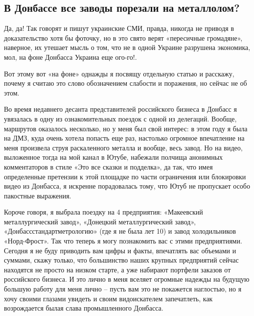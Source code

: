  
 
 
 
 
\subsection{В Донбассе все заводы порезали на металлолом?}
\label{sec:19_12_2021.yz.maj_dnr.1.donbass_zavody}


Да, да! Так говорят и пишут украинские СМИ, правда, никогда не приводя в
доказательство хотя бы фоточку, но в это свято верят «пересичные громадяне»,
наверное, их утешает мысль о том, что не в одной Украине разрушена экономика,
мол, на фоне Донбасса Украина еще ого-го!.


Вот этому вот «на фоне» однажды я посвящу отдельную статью и расскажу, почему я
считаю это слово обозначением слабости и поражения, но сейчас не об этом.

Во время недавнего десанта представителей российского бизнеса в Донбасс я
увязалась в одну из ознакомительных поездок с одной из делегаций. Вообще,
маршрутов оказалось несколько, но у меня был свой интерес: в этом году я была
на ДМЗ, куда очень хотела попасть еще раз, настолько огромное впечатление на
меня произвела струя раскаленного металла и вообще, весь завод. Но на видео,
выложенное тогда на мой канал в Ютубе, набежали полчища анонимных комментаторов
в стиле «Это все сказки и подделка», да так, что имея определенные претензии к
этой площадке по части ограничения или блокировки видео из Донбасса, я искренне
порадовалась тому, что Ютуб не пропускает особо пакостные выражения.

Короче говоря, я выбрала поездку на 4 предприятия: «Макеевский металлургический
завод», «Донецкий металлургический завод», «Донбассстандартметрологию» (где я
не была лет 10) и завод холодильников «Норд-Фрост». Так что теперь я могу
познакомить вас с этими предприятиями. Сегодня я не буду приводить вам цифры и
факты, впечатлять вас объемами и суммами, скажу только, что большинство наших
крупных предприятий сейчас находятся не просто на низком старте, а уже набирают
портфели заказов от российского бизнеса. И это лично в меня вселяет огромные
надежды на будущую большую работу для меня лично – пусть вам это не покажется
наглостью, но я хочу своими глазами увидеть и своим видоискателем запечатлеть,
как возрождается былая слава промышленного Донбасса.


